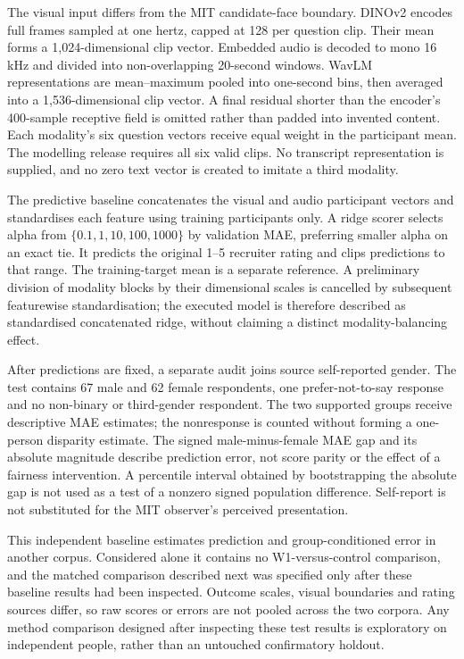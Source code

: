 The visual input differs from the MIT candidate-face boundary. DINOv2 encodes full frames
sampled at one hertz, capped at 128 per question clip. Their mean forms a 1,024-dimensional
clip vector. Embedded audio is decoded to mono 16 kHz and divided into non-overlapping
20-second windows. WavLM representations are mean--maximum pooled into one-second bins,
then averaged into a 1,536-dimensional clip vector. A final residual shorter than the
encoder's 400-sample receptive field is omitted rather than padded into invented content.
Each modality's six question vectors receive equal weight in the participant mean.
The modelling release requires all six valid clips. No transcript representation is supplied,
and no zero text vector is created to imitate a third modality.

The predictive baseline concatenates the visual and audio participant vectors and standardises
each feature using training participants only. A ridge scorer selects alpha from
$\{0.1,1,10,100,1000\}$ by validation MAE, preferring smaller alpha on an exact tie.
It predicts the original 1--5 recruiter rating and clips predictions to that range.
The training-target mean is a separate reference. A preliminary division of modality blocks
by their dimensional scales is cancelled by subsequent featurewise standardisation;
the executed model is therefore described as standardised concatenated ridge, without
claiming a distinct modality-balancing effect.

After predictions are fixed, a separate audit joins source self-reported gender. The test
contains 67 male and 62 female respondents, one prefer-not-to-say response and no non-binary
or third-gender respondent. The two supported groups receive descriptive MAE estimates;
the nonresponse is counted without forming a one-person disparity estimate. The signed
male-minus-female MAE gap and its absolute magnitude describe prediction error, not score
parity or the effect of a fairness intervention. A percentile interval obtained by
bootstrapping the absolute gap is not used as a test of a nonzero signed population
difference. Self-report is not substituted for the MIT observer's perceived presentation.

This independent baseline estimates prediction and group-conditioned error in another
corpus. Considered alone it contains no W1-versus-control comparison, and the matched
comparison described next was specified only after these baseline results had been
inspected. Outcome scales, visual boundaries and rating sources
differ, so raw scores or errors are not pooled across the two corpora. Any method
comparison designed after inspecting these test results is exploratory on independent
people, rather than an untouched confirmatory holdout.

